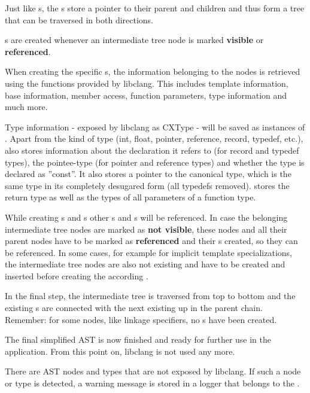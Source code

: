 \newpage
Just like s, the s store a pointer to their parent and children and thus form a tree that can be traversed in both directions.

s are created whenever an intermediate tree node is marked \textbf{visible} or \textbf{referenced}.

When creating the specific s, the information belonging to the nodes is retrieved using the functions provided by libclang. This includes template information, base information, member access, function parameters, type information and much more.

Type information - exposed by libclang as CXType - will be saved as instances of . Apart from the kind of type (int, float, pointer, reference, record, typedef, etc.),  also stores information about the declaration  it refers to (for record and typedef types), the pointee-type (for pointer and reference types) and whether the type is declared as ''const''. It also stores a pointer to the canonical type, which is the same type in its completely desugared form (all typedefs removed).  stores the return type as well as the types of all parameters of a function type.

While creating s and s other s and s will be referenced. In case the belonging intermediate tree nodes are marked as \textbf{not visible}, these nodes and all their parent nodes have to be marked as \textbf{referenced} and their s created, so they can be referenced. In some cases, for example for implicit template specializations, the intermediate tree nodes are also not existing and have to be created and inserted before creating the according .

In the final step, the intermediate tree is traversed from top to bottom and the existing s are connected with the next existing  up in the parent chain. Remember: for some nodes, like linkage specifiers, no s have been created.

The final simplified AST is now finished and ready for further use in the application. From this point on, libclang is not used any more.

There are AST nodes and types that are not exposed by libclang. If such a node or type is detected, a warning message is stored in a logger that belongs to the .

